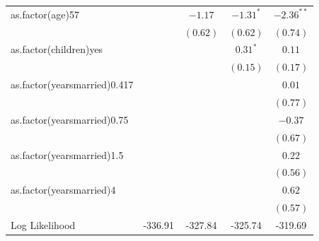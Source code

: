 \documentclass{beamer}
\newcommand{\1}{\mathbb{1}}
\begin{document}
\begin{frame}
\begin{table}[hb!]
\begin{center}
\begin{tabular}{l c c c c }
as.factor(age)57             &               & $-1.17$     & $-1.31^{*}$ & $-2.36^{**}$ \\
                             &               & $(0.62)$    & $(0.62)$    & $(0.74)$     \\
as.factor(children)yes       &               &             & $0.31^{*}$  & $0.11$       \\
                             &               &             & $(0.15)$    & $(0.17)$     \\
as.factor(yearsmarried)0.417 &               &             &             & $0.01$       \\
                             &               &             &             & $(0.77)$     \\
as.factor(yearsmarried)0.75  &               &             &             & $-0.37$      \\
                             &               &             &             & $(0.67)$     \\
as.factor(yearsmarried)1.5   &               &             &             & $0.22$       \\
                             &               &             &             & $(0.56)$     \\
as.factor(yearsmarried)4     &               &             &             & $0.62$       \\
                             &               &             &             & $(0.57)$     \\
\midrule
Log Likelihood               & -336.91       & -327.84     & -325.74     & -319.69      \\
\bottomrule
\end{tabular}
\end{center}
\end{table}
\end{frame}
\end{document}
